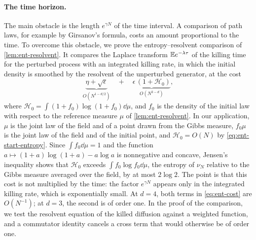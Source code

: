 \paragraph{The time horizon.}
The main obstacle is the length $e^{\gamma N}$ of the time interval. A
comparison of path laws, for example by Girsanov's formula, costs an amount
proportional to the time. To overcome this obstacle, we prove the
entropy--resolvent comparison of \cref{lem:ent-resolvent}. It compares the
Laplace transform $\mathbb E e^{-\lambda\tau}$ of the killing time for the
perturbed process with an integrated killing rate, in which the initial
density is smoothed by the resolvent of the unperturbed generator, at the cost
\begin{equation}\label{eq:ent-cost}
 \underbrace{\eta+\sqrt\epsilon}_{O(N^{1-d/2})}
 \quad+\quad
 \underbrace{\epsilon\,(1+\mathcal H_0)}_{O(N^{3-d})},
\end{equation}
where $\mathcal H_0=\int(1+f_0)\log(1+f_0)\dd\mu$, and $f_0$ is the density
of the initial law with respect to the reference measure $\mu$ of
\cref{lem:ent-resolvent}. In our application, $\mu$ is the joint law of the
field and of a point drawn from the Gibbs measure, $f_0\mu$ is the joint law
of the field and of the initial point, and $\mathcal H_0=O(N)$ by
\eqref{eq:ent-start-entropy}. Since $\int f_0\dd\mu=1$ and the function
$a\mapsto(1+a)\log(1+a)-a\log a$ is nonnegative and concave, Jensen's
inequality shows that $\mathcal H_0$ exceeds $\int f_0\log f_0\dd\mu$, the
entropy of $\nu_N$ relative to the Gibbs measure averaged over the field, by
at most $2\log2$. The point is that this cost is not multiplied by the
time: the factor $e^{\gamma N}$ appears only in the integrated killing rate,
which is exponentially small. At $d=4$, both terms in \eqref{eq:ent-cost} are
$O(N^{-1})$; at $d=3$, the second is of order one. In the proof of the
comparison, we test the resolvent equation of the killed diffusion against a weighted
function, and a commutator identity cancels a cross term that would
otherwise be of order one.

